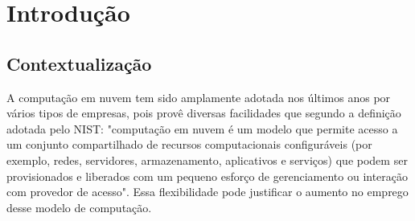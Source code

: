 \chapter{\label{chap:intro}Introdução}




%
%
%
%

\section{Contextualização}


A computação em nuvem tem sido amplamente adotada nos últimos anos por vários tipos de empresas, pois provê diversas facilidades que segundo a definição adotada 
pelo NIST\cite{Mell:2011}: "computação em nuvem é um modelo que permite acesso a um conjunto compartilhado de recursos computacionais configuráveis (por exemplo, redes, servidores, armazenamento, aplicativos e serviços) que podem ser provisionados e liberados  com um pequeno esforço de gerenciamento ou interação com provedor de acesso". Essa flexibilidade pode justificar o aumento no emprego desse modelo de computação.

